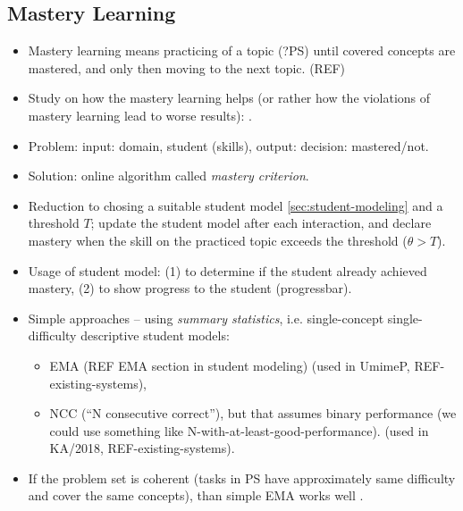 \subsection{Mastery Learning}
\label{sec:mastery-learning}

\begin{itemize}
\item Mastery learning means practicing of a topic (?PS) until covered concepts
  are mastered, and only then moving to the next topic. (REF)
\item Study on how the mastery learning helps (or rather how the violations of mastery learning
  lead to worse results): \cite{mastery-learning-scale}.
\item Problem: input: domain, student (skills), output: decision: mastered/not.
\item Solution: online algorithm called \emph{mastery criterion}.
\item Reduction to chosing a suitable student model \ref{sec:student-modeling}
  and a threshold $T$;
  update the student model after each interaction,
  and declare mastery when the skill
  on the practiced topic exceeds the threshold
  ($\theta > T$).
\item Usage of student model:
  (1) to determine if the student already achieved mastery,
  (2) to show progress to the student (progressbar).
\item Simple approaches -- using \emph{summary statistics}, i.e.
  single-concept single-difficulty descriptive student models:  %
\begin{itemize}
\item EMA (REF EMA section in student modeling) (used in UmimeP, REF-existing-systems),
\item NCC (``N consecutive correct''), but that assumes binary performance
  (we could use something like N-with-at-least-good-performance).
  (used in KA/2018, REF-existing-systems).
\end{itemize}
\item If the problem set is coherent (tasks in PS have approximately same difficulty
  and cover the same concepts), than simple EMA works well \cite{alg.mastery}.

\end{itemize}
